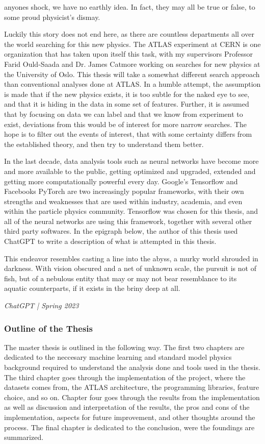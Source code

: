 anyones shock, we have no earthly idea. In fact, they may all be true or false, to some proud 
physicist's dismay. \par Luckily this story does not end here, as there are countless departments all 
over the world searching for this new physics. The ATLAS experiment at CERN is one organization that 
has taken upon itself this task, with my supervisors Professor Farid Ould-Saada and Dr. James Catmore working 
on searches for new physics at the University of Oslo. This thesis will take a somewhat different search 
approach than conventional analyses done at ATLAS. In a humble attempt, the assumption is made that 
if the new physics exists, it is too subtle for the naked eye to see, and that it is hiding in the data
in some set of features. Further, it is assumed that by focusing on data we can label and that we know 
from experiment to exist, deviations from this would be of interest for more narrow searches. The hope is 
to filter out the events of interest, that with some certainty differs from the established theory, 
and then try to understand them better. \par 
In the last decade, data analysis tools such as neural networks have become more and more available 
to the public, getting optimized and upgraded, extended and getting more computationally powerful every 
day. Google's Tensorflow\cite{tensorflow-whitepaper} and Facebooks PyTorch\cite{paszkepytorch} 
are two increasingly popular frameworks, with their own strengths and weaknesses that are used within industry, 
academia, and even within the particle physics community. Tensorflow was chosen for this thesis, and 
all of the neural networks are using this framework, together with several other third party softwares. 
In the epigraph below, the author of this thesis used ChatGPT to write a description of what is 
attempted in this thesis. 

\epigraph{
    This endeavor resembles casting a line into the abyss, a murky world 
shrouded in darkness. With vision obscured and a net of unknown scale, 
the pursuit is not of fish, but of a nebulous entity that may or may 
not bear resemblance to its aquatic counterparts, if it exists in 
the briny deep at all.}{\textit{ChatGPT | Spring 2023}}

\par 

\subsubsection*{Outline of the Thesis}
The master thesis is outlined in the following way. The first two chapters are dedicated to the neccesary machine learning and
standard model physics background required to understand the analysis done and tools used in the thesis. The third chapter goes 
through the implementation of the project, where the datasets comes from, the ATLAS architecture, the programming libraries, 
feature choice, and so on. Chapter four goes through the results from the implementation as well as discussion and 
interpretation of the results, the pros and cons of the implementation, aspects for future improvement, and other thoughts around the process.
The final chapter is dedicated to the conclusion, were the foundings are summarized. 


